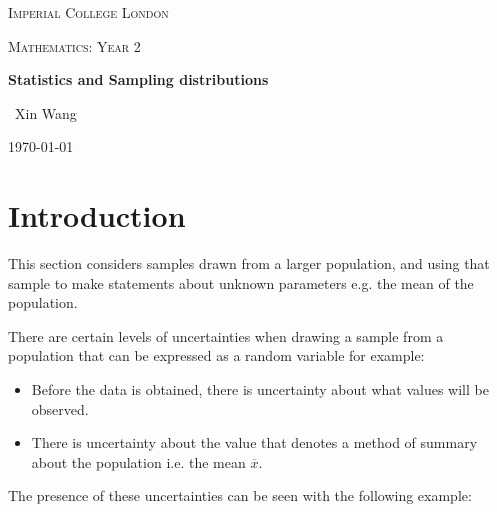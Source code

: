 \documentclass[10pt,a4paper]{article}
\begin{document}

\begin{titlepage}
	\centering
	{\scshape\LARGE Imperial College London \par}
	\vspace{1cm}
    {\scshape\Large Mathematics: Year 2\par}
    \vspace{1.5cm}
	{\huge\bfseries Statistics and Sampling distributions\par}
	\vspace{2cm}
	{\Large\ Xin Wang }
	\vfill
	{\large \today\par}
\end{titlepage}


\tableofcontents
\pagebreak

\section{Introduction}

This section considers samples drawn from a larger population, and using that sample to
make statements about unknown parameters e.g. the mean of the population.

There are certain levels of uncertainties when drawing a sample from a population that can be
expressed as a random variable for example:
\begin{itemize}
    \item Before the data is obtained, there is uncertainty about what values will be observed.
    \item There is uncertainty about the value that denotes a method of summary about the population
    i.e. the mean $\overline{x}$.
\end{itemize}

The presence of these uncertainties can be seen with the following example:
\end{document}
